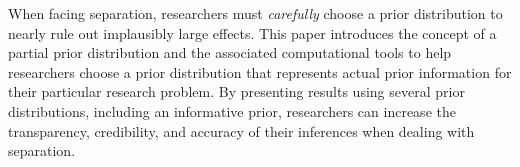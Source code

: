 \documentclass[12pt]{article}
\begin{document}
When facing separation, researchers must \emph{carefully} choose a prior distribution to nearly rule out implausibly large effects. 
This paper introduces the concept of a partial prior distribution and the associated computational tools to help researchers choose a prior distribution that represents actual prior information for their particular research problem. 
By presenting results using several prior distributions, including an informative prior, researchers can increase the transparency, credibility, and accuracy of their inferences when dealing with separation.

\singlespace


\end{document}
